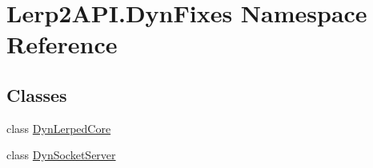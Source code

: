 \hypertarget{namespace_lerp2_a_p_i_1_1_dyn_fixes}{}\section{Lerp2\+A\+P\+I.\+Dyn\+Fixes Namespace Reference}
\label{namespace_lerp2_a_p_i_1_1_dyn_fixes}
\subsection*{Classes}
\begin{DoxyCompactItemize}
\item 
class \hyperlink{class_lerp2_a_p_i_1_1_dyn_fixes_1_1_dyn_lerped_core}{Dyn\+Lerped\+Core}
\item 
class \hyperlink{class_lerp2_a_p_i_1_1_dyn_fixes_1_1_dyn_socket_server}{Dyn\+Socket\+Server}
\end{DoxyCompactItemize}
